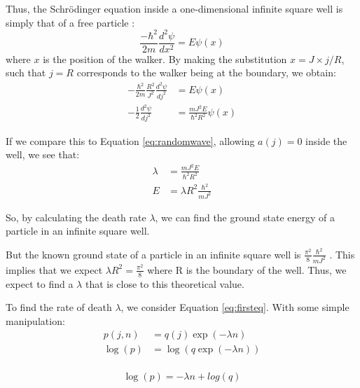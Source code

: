 \documentclass[journal]{IEEEtran}
\begin{document}
Thus, the Schr\"{o}dinger equation inside a one-dimensional infinite square well
is simply that of a free particle :
\begin{equation}
  \frac{-\hbar^2}{2m}\frac{d^2 \psi}{dx^2} = E\psi(x)
  \nonumber
\end{equation}
where $x$ is the position of the walker. By making the substitution $x = J
\times j/R$, such that $j=R$ corresponds to the walker being at the boundary, we
obtain:
\begin{equation}
  \begin{split}
    -\frac{\hbar^2}{2m}\frac{R^2}{J^2}\frac{d^2\psi}{dj^2} &= E\psi(x)\\
    -\frac{1}{2}\frac{d^2\psi}{dj^2} &= \frac{mJ^2E}{\hbar^2R^2}\psi(x)
  \end{split}
  \nonumber
\end{equation}

If we compare this to Equation \ref{eq:randomwave}, allowing $a(j) = 0$ inside
the well, we see that:
\begin{equation}
  \begin{split}
    \lambda &= \frac{mJ^2E}{\hbar^2R^2} \\
    E &= \lambda R^2 \frac{\hbar^2}{mJ^2}
  \end{split}
  \nonumber
\end{equation}

So, by calculating the death rate $\lambda$, we can find the ground state energy
of a particle in an infinite square well.

But the known ground state of a particle in an infinite square well is
$\frac{\pi^2}{8}\frac{\hbar^2}{mJ^2}$ . This implies that we expect $\lambda
R^2=\frac{\pi^2}{8}$ where R is the boundary of the well. Thus, we expect to
find a $\lambda$ that is close to this theoretical value.


To find the rate of death $\lambda$, we consider Equation \ref{eq:firsteq}. With
some simple manipulation:
\begin{equation}
  \begin{split}
    p(j, n) & = q(j) \exp(-\lambda n)\\
    \log(p) & = \log(q \exp(-\lambda n)) \\
  \end{split}
  \nonumber
\end{equation}

\begin{equation}
  \log(p) = -\lambda n + log(q)
  \label{eq:straightline}
\end{equation}
\end{document}

